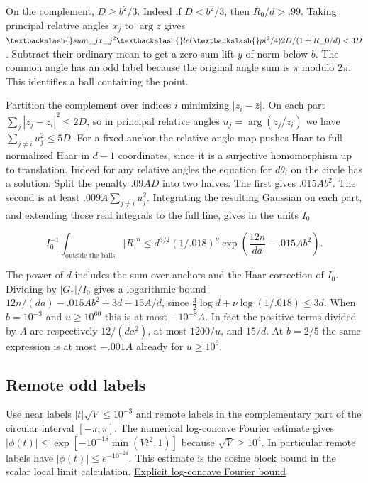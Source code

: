 \documentclass[11pt]{article}
\begin{document}
On the complement, $D\ge b^2/3$. Indeed if $D<b^2/3$,
then $R_0/d>.99$. Taking principal relative angles $x_j$ to
$\arg\bar z$ gives $\textbackslash{}sum\_j x\_j^2\textbackslash{}le
(\textbackslash{}pi^2/4)2D/(1+R\_0/d)<3D$. Subtract their ordinary mean to get
a zero-sum lift $y$ of norm below $b$. The common angle has an odd
label because the original angle sum is $\pi$ modulo $2\pi$.
This identifies a ball containing the point.

Partition the complement over indices $i$ minimizing
$|z_i-\bar z|$. On each part
$\sum_j|z_j-z_i|^2\le2D$, so in principal relative angles
$u_j=\arg(z_j/z_i)$ we have $\sum_{j\ne i}u_j^2\le5D$.
For a fixed anchor the relative-angle map pushes Haar to
full normalized Haar in $d-1$ coordinates, since it is a
surjective homomorphism up to translation. Indeed for any
relative angles the equation for $d\theta_i$ on the circle
has a solution. Split the penalty $.09AD$ into two halves.
The first gives $.015Ab^2$. The second is at least
$.009 A\sum_{j\ne i}u_j^2$. Integrating the resulting Gaussian
on each part, and extending those real integrals to the full
line, gives in the units $I_0$

\[
I_0^{-1}\int_{\text{outside the balls}} |R|^n
\le d^{3/2}(1/.018)^\nu
       \exp\left(\frac{12n}{da}-.015 A b^2\right).
\]

The power of $d$ includes the sum over anchors and the
Haar correction of $I_0$. Dividing by $|G_{\ast}|/I_0$ gives a
logarithmic bound $12n/(da)-.015Ab^2+3d+15A/d$,
since $\tfrac32\log d+\nu\log(1/.018)\le3d$.
When $b=10^{-3}$ and $u\ge10^{60}$ this is at most
$-10^{-8}A$. In fact the positive terms divided by $A$
are respectively $12/(da^2)$, at most $1200/u$, and $15/d$.
At $b=2/5$ the same expression is at most $-.001A$ already
for $u\ge10^6$.

\subsection{Remote odd labels}

Use near labels $|t|\sqrt V\le10^{-3}$ and remote labels
in the complementary part of the circular interval $[-\pi,\pi]$.
The numerical log-concave Fourier estimate gives
$|\phi(t)|\le\exp[-10^{-18}\min(Vt^2,1)]$ because
$\sqrt V\ge10^4$. In particular remote labels have
$|\phi(t)|\le e^{-10^{-24}}$. This estimate is the cosine
block bound in the scalar local limit calculation.
\href{https://github.com/ProgramComputer/open-math-research/blob/main/topics/balanced-arrays/adjacent-quotas/scalar.md\#an-explicit-scalar-local-limit-estimate}{Explicit log-concave Fourier bound}
\end{document}
